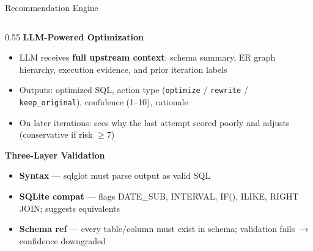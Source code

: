 \documentclass[10pt,aspectratio=169]{beamer}
\newcommand{\Raleway}{\sffamily}
\begin{document}
\begin{frame}{Recommendation Engine}
\begin{columns}[T]
    \begin{column}{0.55\textwidth}
      {\small\Raleway\bfseries\color{aggieblue} LLM-Powered Optimization}\\[0.4em]
      \footnotesize
      \begin{itemize}
        \setlength{\itemsep}{0.35em}
        \item LLM receives \textbf{full upstream context}: schema summary, ER graph hierarchy, execution evidence, and prior iteration labels
        \item Outputs: optimized SQL, action type (\texttt{optimize} / \texttt{rewrite} / \texttt{keep\_original}), confidence (1--10), rationale
        \item On later iterations: sees why the last attempt scored poorly and adjusts (conservative if risk $\geq 7$)
      \end{itemize}

      \vspace{0.3em}
      {\small\Raleway\bfseries\color{aggieblue} Three-Layer Validation}\\[0.4em]
      \footnotesize
      \begin{itemize}
        \setlength{\itemsep}{0.35em}
        \item \textbf{Syntax} --- sqlglot must parse output as valid SQL
        \item \textbf{SQLite compat} --- flags DATE\_SUB, INTERVAL, IF(), ILIKE, RIGHT JOIN; suggests equivalents
        \item \textbf{Schema ref} --- every table/column must exist in schema; validation fails $\to$ confidence downgraded
      \end{itemize}
    \end{column}

  \end{columns}
\end{frame}

\end{document}
